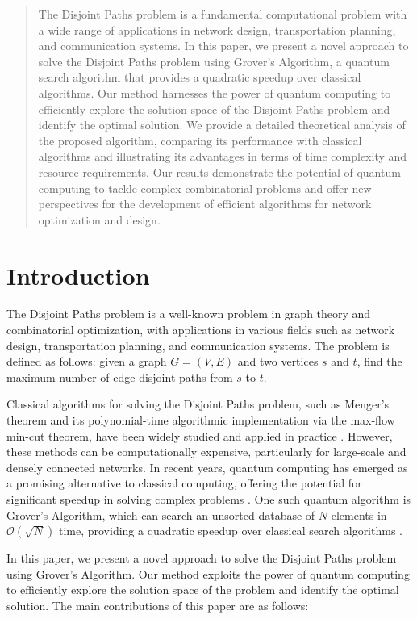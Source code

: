 \begin{abstract}
The Disjoint Paths problem is a fundamental computational problem with a wide range of applications in network design, transportation planning, and communication systems. In this paper, we present a novel approach to solve the Disjoint Paths problem using Grover's Algorithm, a quantum search algorithm that provides a quadratic speedup over classical algorithms. Our method harnesses the power of quantum computing to efficiently explore the solution space of the Disjoint Paths problem and identify the optimal solution. We provide a detailed theoretical analysis of the proposed algorithm, comparing its performance with classical algorithms and illustrating its advantages in terms of time complexity and resource requirements. Our results demonstrate the potential of quantum computing to tackle complex combinatorial problems and offer new perspectives for the development of efficient algorithms for network optimization and design.
\end{abstract}

\section{Introduction}
The Disjoint Paths problem is a well-known problem in graph theory and combinatorial optimization, with applications in various fields such as network design, transportation planning, and communication systems. The problem is defined as follows: given a graph $G=(V, E)$ and two vertices $s$ and $t$, find the maximum number of edge-disjoint paths from $s$ to $t$.

Classical algorithms for solving the Disjoint Paths problem, such as Menger's theorem and its polynomial-time algorithmic implementation via the max-flow min-cut theorem, have been widely studied and applied in practice \cite{Menger1927, Ford1956}. However, these methods can be computationally expensive, particularly for large-scale and densely connected networks. In recent years, quantum computing has emerged as a promising alternative to classical computing, offering the potential for significant speedup in solving complex problems \cite{Shor1994, Grover1996}. One such quantum algorithm is Grover's Algorithm, which can search an unsorted database of $N$ elements in $\mathcal{O}(\sqrt{N})$ time, providing a quadratic speedup over classical search algorithms \cite{Grover1996}.

In this paper, we present a novel approach to solve the Disjoint Paths problem using Grover's Algorithm. Our method exploits the power of quantum computing to efficiently explore the solution space of the problem and identify the optimal solution. The main contributions of this paper are as follows:

